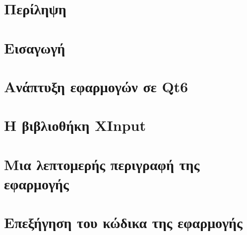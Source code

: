 \documentclass[a4paper,11pt,oneside,openany]{ioniothesis}
\begin{document}
\chapter*{Περίληψη} \pagestyle{headings}



\cleardoublepage

%


\cleardoublepage

\tableofcontents
\cleardoublepage




\listoffigures
\cleardoublepage
\listoftables

\setlength{\parskip}{5pt}



\pagestyle{headings}
\cleardoublepage


\newpage
{}


\cleardoublepage


\chapter{Εισαγωγή} \label{chapter:intro}


\chapter{Ανάπτυξη εφαρμογών σε Qt6} \label{chapter:qt6}


\chapter{Η βιβλιοθήκη XInput} \label{chapter:xinput}


\chapter{Μια λεπτομερής περιγραφή της εφαρμογής} \label{chapter:app}



\chapter{Επεξήγηση του κώδικα της εφαρμογής} \label{chapter:source}

\end{document}
